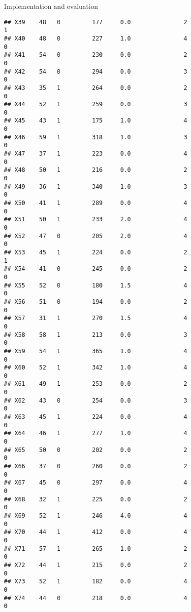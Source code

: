 \documentclass[
  ignorenonframetext,
]{beamer}
\begin{document}
\begin{frame}[fragile]{Implementation and evaluation}
\begin{verbatim}
## X39    48   0         177     0.0               2                   1
## X40    48   0         227     1.0               4                   0
## X41    54   0         230     0.0               2                   0
## X42    54   0         294     0.0               3                   0
## X43    35   1         264     0.0               2                   0
## X44    52   1         259     0.0               3                   0
## X45    43   1         175     1.0               4                   0
## X46    59   1         318     1.0               3                   0
## X47    37   1         223     0.0               4                   0
## X48    50   1         216     0.0               2                   0
## X49    36   1         340     1.0               3                   0
## X50    41   1         289     0.0               4                   0
## X51    50   1         233     2.0               4                   0
## X52    47   0         205     2.0               4                   0
## X53    45   1         224     0.0               2                   1
## X54    41   0         245     0.0               2                   0
## X55    52   0         180     1.5               4                   0
## X56    51   0         194     0.0               2                   0
## X57    31   1         270     1.5               4                   0
## X58    58   1         213     0.0               3                   0
## X59    54   1         365     1.0               4                   0
## X60    52   1         342     1.0               4                   0
## X61    49   1         253     0.0               2                   0
## X62    43   0         254     0.0               3                   0
## X63    45   1         224     0.0               4                   0
## X64    46   1         277     1.0               4                   0
## X65    50   0         202     0.0               2                   0
## X66    37   0         260     0.0               2                   0
## X67    45   0         297     0.0               4                   0
## X68    32   1         225     0.0               2                   0
## X69    52   1         246     4.0               4                   0
## X70    44   1         412     0.0               4                   0
## X71    57   1         265     1.0               2                   0
## X72    44   1         215     0.0               2                   0
## X73    52   1         182     0.0               4                   0
## X74    44   0         218     0.0               4                   0

\end{verbatim}
\end{frame}
\end{document}
